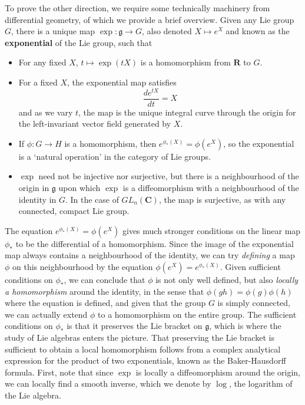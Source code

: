 To prove the other direction, we require some technically machinery from differential geometry, of which we provide a brief overview. Given any Lie group $G$, there is a unique map $\exp: \mathfrak{g} \to G$, also denoted $X \mapsto e^X$ and known as the {\bf exponential} of the Lie group, such that
%
\begin{itemize}
    \item For any fixed $X$, $t \mapsto \exp(tX)$ is a homomorphism from $\mathbf{R}$ to $G$.
    \item For a fixed $X$, the exponential map satisfies
    \[ \frac{de^{tX}}{dt} = X \]
    and as we vary $t$, the map is the unique integral curve through the origin for the left-invariant vector field generated by $X$.
    \item If $\phi: G \to H$ is a homomorphism, then $e^{\phi_*(X)} = \phi(e^X)$, so the exponential is a `natural operation' in the category of Lie groups.
    \item $\exp$ need not be injective nor surjective, but there is a neighbourhood of the origin in $\mathfrak{g}$ upon which $\exp$ is a diffeomorphism with a neighbourhood of the identity in $G$. In the case of $GL_n(\mathbf{C})$, the map is surjective, as with any connected, compact Lie group.
\end{itemize}
%
The equation $e^{\phi_*(X)} = \phi(e^X)$ gives much stronger conditions on the linear map $\phi_*$ to be the differential of a homomorphism. Since the image of the exponential map always contains a neighbourhood of the identity, we can try {\it defining} a map $\phi$ on this neighbourhood by the equation $\phi(e^X) = e^{\phi_*(X)}$. Given sufficient conditions on $\phi_*$, we can conclude that $\phi$ is not only well defined, but also {\it locally a homomorphism} around the identity, in the sense that $\phi(gh) = \phi(g) \phi(h)$ where the equation is defined, and given that the group $G$ is simply connected, we can actually extend $\phi$ to a homomorphism on the entire group. The sufficient conditions on $\phi_*$ is that it preserves the Lie bracket on $\mathfrak{g}$, which is where the study of Lie algebras enters the picture. That preserving the Lie bracket is sufficient to obtain a local homomorphism follows from a complex analytical expression for the product of two exponentials, known as the Baker-Hausdorff formula. First, note that since $\exp$ is locally a diffeomorphism around the origin, we can locally find a smooth inverse, which we denote by $\log$, the logarithm of the Lie algebra.

